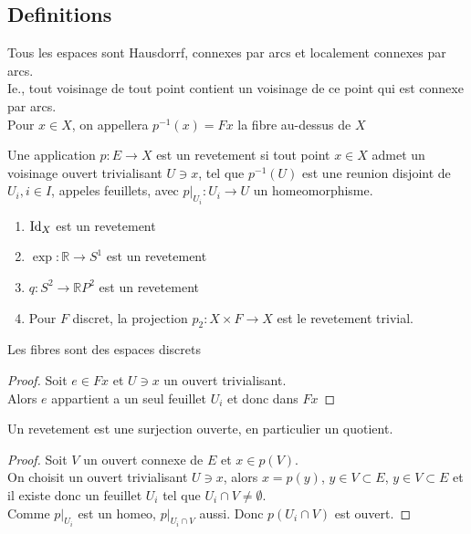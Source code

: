\documentclass[../main.tex]{subfiles}
\begin{document}
\subsection{Definitions}
Tous les espaces sont Hausdorrf, connexes par arcs et localement connexes par arcs.\\
Ie.,  tout voisinage de tout point contient un voisinage de ce point qui est connexe par arcs.\\
Pour $x\in X$, on appellera $p^{-1}( x) = Fx$ la fibre au-dessus de $X$ 
\begin{defn}
	Une application $p: E \to X$ est un revetement si tout point $x\in X$ admet un voisinage ouvert trivialisant $U \ni x$, tel que $p^{-1}( U) $ est une reunion disjoint de $U_i, i \in I$, appeles feuillets, avec $p|_{U_i} : U_i \to U$ un homeomorphisme.
\end{defn}
\begin{exemple}
\begin{enumerate}
\item $\operatorname{Id}_X$ est un revetement
\item $\exp : \mathbb{R}\to S^{1}$ est un revetement
\item $q: S^{2} \to \mathbb{R}P^{2}$ est un revetement
\item Pour $F$ discret, la projection $p_2 : X\times F\to X$ est le revetement trivial.
\end{enumerate}

\end{exemple}
\begin{lemma}
Les fibres sont des espaces discrets
\end{lemma}
\begin{proof}
Soit $e\in Fx$ et $U\ni x$ un ouvert trivialisant.\\
Alors $e$ appartient a un seul feuillet $U_i$ et donc dans $Fx$ 
\end{proof}
\begin{propo}
Un revetement est une surjection ouverte, en particulier un quotient. 
\end{propo}
\begin{proof}
Soit $V$ un ouvert connexe de $E$ et $x\in p( V) $.\\
On choisit un ouvert trivialisant $U \ni x$, alors $x= p( y) $, $y \in V \subset E$, $y \in V \subset E$ et il existe donc un feuillet $U_i$ tel que $U_i \cap V\neq \emptyset$.\\
Comme $p|_{U_i} $ est un homeo, $p|_{U_i \cap V} $ aussi. Donc $p( U_i \cap V) $ est ouvert.
\end{proof}



	
\end{document}
